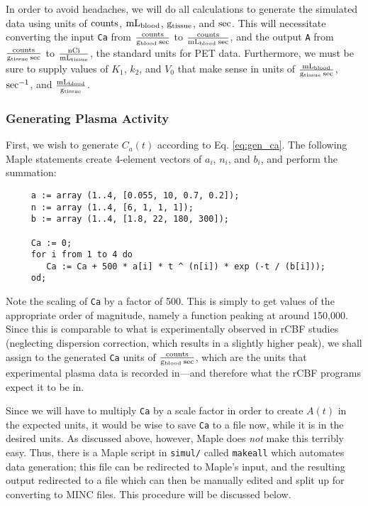 \documentclass[11pt]{article}
\newcommand{\units}[1]{\mbox{$\rm{#1}$}}
\newcommand{\funits}[2]{\mbox{$\rm\frac{#1}{#2}$}}
\begin{document}
In order to avoid headaches, we will do all calculations to generate
the simulated data using units of \units{counts}, \units{mL_{blood}},
\units{g_{tissue}}, and \units{sec}.  This will necessitate converting
the input \verb|Ca| from \units{\frac{counts}{g_{blood}\:sec}} to
\funits{counts}{mL_{blood}\:sec}, and the output \verb|A| from
\funits{counts}{g_{tissue}\:sec} to
\funits{nCi}{mL_{tissue}}, the standard units for PET data.
Furthermore, we must be sure to supply values of $K_{1}$, $k_{2}$, and
$V_{0}$ that make sense in units of
\funits{mL_{blood}}{g_{tissue}\:sec}, \units{sec^{-1}}, and
\funits{mL_{blood}}{g_{tissue}}.


\subsubsection{Generating Plasma Activity}

First, we wish to generate $C_{a}(t)$ according to Eq. \ref{eq:gen_ca}.  The
following Maple statements create 4-element vectors of $a_{i}$, $n_{i}$, and
$b_{i}$, and perform the summation:

\begin{verbatim}
     a := array (1..4, [0.055, 10, 0.7, 0.2]);
     n := array (1..4, [6, 1, 1, 1]);
     b := array (1..4, [1.8, 22, 180, 300]);

     Ca := 0;
     for i from 1 to 4 do
        Ca := Ca + 500 * a[i] * t ^ (n[i]) * exp (-t / (b[i]));
     od;
\end{verbatim}

Note the scaling of \verb|Ca| by a factor of 500.  This is simply to
get values of the appropriate order of magnitude, namely a function
peaking at around 150,000.  Since this is comparable to what is
experimentally observed in rCBF studies (neglecting dispersion
correction, which results in a slightly higher peak), we shall assign to the
generated \verb|Ca| units of \funits{counts}{g_{blood}\:sec},
which are the units that experimental plasma data is recorded in---and
therefore what the rCBF programs expect it to be in.

Since we will have to multiply \verb|Ca| by a scale factor in order to
create $A(t)$ in the expected units, it would be wise to save
\verb|Ca| to a file now, while it is in the desired units.  As
discussed above, however, Maple does {\em not} make this terribly
easy.  Thus, there is a Maple script in
\verb|simul/| called \verb|makeall| which
automates data generation; this file can be redirected to Maple's
input, and the resulting output redirected to a file which can then be
manually edited and split up for converting to MINC files.  This
procedure will be discussed below.
\end{document}
